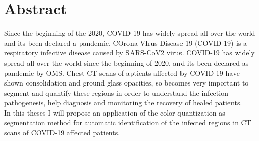 \documentclass{standalone}
\begin{document}
	\chapter*{Abstract}
	Since the beginning of the 2020, COVID-19 has widely spread all over the world and its been declared a pandemic. 
	COrona VIrus Disease 19 (COVID-19) is a respiratory infective disease caused by SARS-CoV2 virus. COVID-19 has widely spread all over the world since the beginning of 2020, and its been declared as pandemic by OMS. Chest CT scans of aptients affected by COVID-19 have shown consolidation and ground glass opacities, so becomes very important to segment and quantify these regions in order to understand the infection pathogenesis, help diagnosis and monitoring the recovery of healed patients.\\ 
	In this theses I will propose an application of the color quantization as segmentation method for automatic identification of the infected regions in CT scans of COVID-19 affected patients.
	
\end{document}
